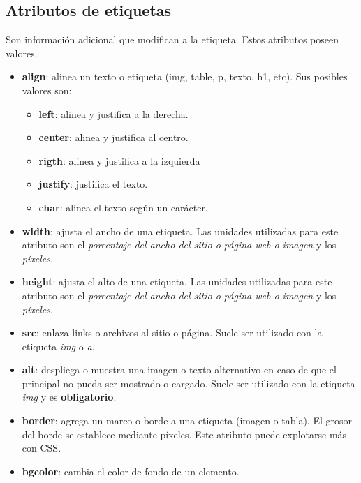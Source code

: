\subsection{Atributos de etiquetas}

Son información adicional que modifican a la etiqueta. Estos atributos poseen valores.
\begin{itemize}
    \item \textbf{align}: alinea un texto o etiqueta (img, table, p, texto, h1, etc). Sus posibles valores son:
    \begin{itemize}
        \item \textbf{left}: alinea y justifica a la derecha.
        \item \textbf{center}: alinea y justifica al centro.
        \item \textbf{rigth}: alinea y justifica a la izquierda
        \item \textbf{justify}: justifica el texto.
        \item \textbf{char}: alinea el texto según un carácter.
    \end{itemize}
    \item \textbf{width}: ajusta el ancho de una etiqueta. Las unidades utilizadas para este atributo son el \textit{porcentaje del ancho del sitio o página web o imagen} y los \textit{píxeles}.
    \item \textbf{height}: ajusta el alto de una etiqueta. Las unidades utilizadas para este atributo son el \textit{porcentaje del ancho del sitio o página web o imagen} y los \textit{píxeles}.
    \item \textbf{src}: enlaza links o archivos al sitio o página. Suele ser utilizado con la etiqueta \textit{img} o \textit{a}.
    \item \textbf{alt}: despliega o muestra una imagen o texto alternativo en caso de que el principal no pueda ser mostrado o cargado. Suele ser utilizado con la etiqueta \textit{img} y es \textbf{obligatorio}.
    \item \textbf{border}: agrega un marco o borde a una etiqueta (imagen o tabla). El grosor del borde se establece mediante píxeles. Este atributo puede explotarse más con CSS.
    \item \textbf{bgcolor}: cambia el color de fondo de un elemento.
\end{itemize}

